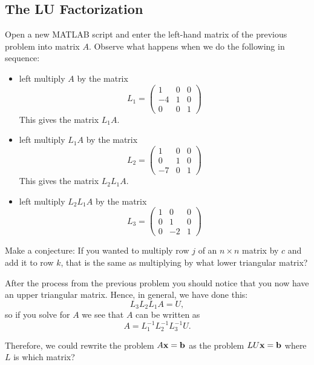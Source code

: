 \subsection{The LU Factorization}
\begin{problem}
    Open a new MATLAB script and enter the left-hand matrix of the previous problem into
    matrix $A$.  Observe what happens when we do the following in sequence:
    \begin{itemize}
        \item left multiply $A$ by the matrix
            \[ L_1 = \begin{pmatrix} 1 & 0 & 0 \\ -4 & 1 & 0 \\ 0 & 0 & 1 \end{pmatrix} \]
            This gives the matrix $L_1 A$.
        \item left multiply $L_1 A$ by the matrix
            \[ L_2 = \begin{pmatrix} 1 & 0 & 0 \\ 0 & 1 & 0 \\ -7 & 0 & 1 \end{pmatrix} \]
            This gives the matrix $L_2 L_1 A$.
        \item left multiply $L_2 L_1 A$ by the matrix 
            \[ L_3 = \begin{pmatrix} 1 & 0 & 0 \\ 0 & 1 & 0 \\ 0 & -2 & 1 \end{pmatrix} \]

    \end{itemize}
    Make a conjecture: If you wanted to multiply row $j$ of an $n\times n$ matrix by $c$
    and add it to row $k$, that is the same as multiplying by what lower triangular
    matrix?
\end{problem}

\begin{problem}
    After the process from the previous problem you should notice that you now have an
    upper triangular matrix.  Hence, in general, we have done this:
    \[ L_3 L_2 L_1 A = U, \]
    so if you solve for $A$ we see that $A$ can be written as
    \[ A = L_1^{-1} L_2^{-1} L_3^{-1} U. \]
    
    Therefore, we could rewrite the problem $A {\bf x} = {\bf b}$ as the
    problem $LU{\bf x} = {\bf b}$ where $L$ is which matrix?
\end{problem}



